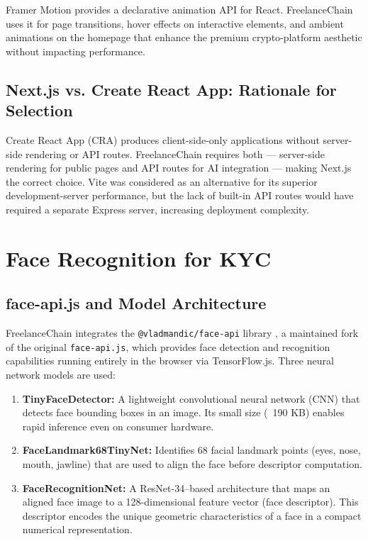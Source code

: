 Framer Motion \cite{framermotion2023} provides a declarative animation API for React. FreelanceChain uses it for page transitions, hover effects on interactive elements, and ambient animations on the homepage that enhance the premium crypto-platform aesthetic without impacting performance.

\subsection{Next.js vs. Create React App: Rationale for Selection}

Create React App (CRA) produces client-side-only applications without server-side rendering or API routes. FreelanceChain requires both --- server-side rendering for public pages and API routes for AI integration --- making Next.js the correct choice. Vite was considered as an alternative for its superior development-server performance, but the lack of built-in API routes would have required a separate Express server, increasing deployment complexity.

\section{Face Recognition for KYC}
\label{section:3.5}

\subsection{face-api.js and Model Architecture}

FreelanceChain integrates the \texttt{@vladmandic/face-api} library \cite{vladmandic2021faceapi}, a maintained fork of the original \texttt{face-api.js}, which provides face detection and recognition capabilities running entirely in the browser via TensorFlow.js. Three neural network models are used:

\begin{enumerate}
    \item \textbf{TinyFaceDetector:} A lightweight convolutional neural network (CNN) that detects face bounding boxes in an image. Its small size (~190 KB) enables rapid inference even on consumer hardware.
    \item \textbf{FaceLandmark68TinyNet:} Identifies 68 facial landmark points (eyes, nose, mouth, jawline) that are used to align the face before descriptor computation.
    \item \textbf{FaceRecognitionNet:} A ResNet-34--based architecture that maps an aligned face image to a 128-dimensional feature vector (face descriptor). This descriptor encodes the unique geometric characteristics of a face in a compact numerical representation.
\end{enumerate}

